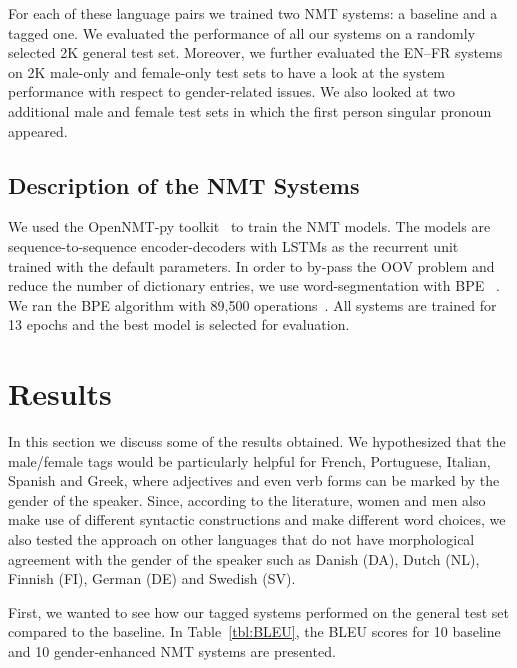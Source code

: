 For each of these language pairs we trained two NMT systems: a baseline and a tagged one. We evaluated the performance of all our systems on a randomly selected 2K general test set. Moreover, we further evaluated the EN--FR systems on 2K male-only and female-only test sets to have a look at the system performance with respect to gender-related issues. We also looked at two additional male and female test sets in which the first person singular pronoun appeared. 

\subsection{Description of the NMT Systems}
We used the OpenNMT-py toolkit~\cite{Klein2017} to train the NMT models. The models are sequence-to-sequence encoder-decoders with LSTMs as the recurrent unit~\cite{Bahdanau2014,Cho2014,Sutskever2014} trained with the default parameters. In order to by-pass the OOV problem and reduce the number of dictionary entries, we use word-segmentation with BPE ~\cite{Sennrich2015}. We ran the BPE algorithm with 89,500 operations~\cite{Sennrich2015}. All systems are trained for 13 epochs and the best model is selected for evaluation.

\section{Results}\label{sec:results}
In this section we discuss some of the results obtained. We hypothesized that the male/female tags would be particularly helpful for French, Portuguese, Italian, Spanish and Greek, where adjectives and even verb forms can be marked by the gender of the speaker. Since, according to the literature, women and men also make use of different syntactic constructions and make different word choices, we also tested the approach on other languages that do not have morphological agreement with the gender of the speaker such as Danish (DA), Dutch (NL), Finnish (FI), German (DE) and Swedish (SV). 

First, we wanted to see how our tagged systems performed on the general test set compared to the baseline. In Table~\ref{tbl:BLEU}, the BLEU scores for 10 baseline and 10 gender-enhanced NMT systems are presented.

